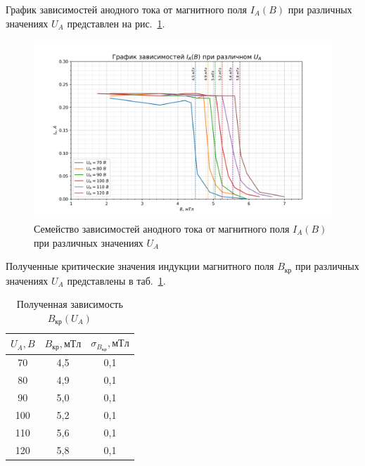 \documentclass[a4paper, 12pt]{article}
\begin{document}
График зависимостей анодного тока от магнитного поля $I_A(B)$ при различных значениях $U_A$ представлен на рис.~\ref{ris5}.

\vspace{5cm}

\begin{figure}[h!]
\begin{flushleft}
    \includegraphics[scale=0.7]{3.3.1_3.png}
\end{flushleft}
\caption{Семейство зависимостей анодного тока от магнитного поля $I_A(B)$ при различных значениях $U_A$}
\label{ris5}
\end{figure}

Полученные критические значения индукции магнитного поля $B_{кр}$ при различных значениях $U_A$ представлены в таб.~\ref{tab11}.

\vspace{5cm}

\begin{table}[h!]
\begin{center}
\begin{tabular}{|c|c|c|}
\hline
$U_A, B$ & $B_{кр}, мТл$ & $\sigma_{B_{кр}}, мТл$ \\ \hline
70 & 4,5 & 0,1 \\ \hline
80 & 4,9 & 0,1 \\ \hline
90 & 5,0 & 0,1 \\ \hline
100 & 5,2 & 0,1 \\ \hline
110 & 5,6 & 0,1 \\ \hline
120 & 5,8 & 0,1 \\ \hline
\end{tabular}
\end{center}
\caption{Полученная зависимость $B_{кр}(U_A)$}
\label{tab11}
\end{table}
\end{document}

